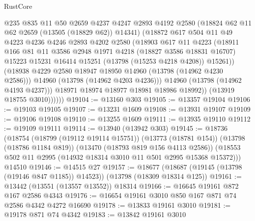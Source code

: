 \begin{lexlean}{RustCore}
\begin{coremodule}
                    @235
                    @835
                    @11
                    @50
                    @2659
                    @4237
                    @4247
                    @2893
                    @4192
                    @2580
                    (@18824 @62 @11 @62 @2659 (@13505 (@18829 @62)) @14341)
                    (@18872
                      @617
                      @504
                      @11
                      @49
                      @4223
                      @4236
                      @4246
                      @2893
                      @4202
                      @2580
                      (@18903
                        @617
                        @11
                        @4223
                        (@18911
                          @166
                          @81
                          @11
                          @3586
                          @2948
                          @1971
                          @4218
                          (@18827 @3586 @18831 @16707)
                          @15223
                          @15231
                          @16414
                          @15251
                          (@13798 (@15253 @4218 @4208))
                          @15261))
                      (@18938 @4229 @2580 @18947 @18950 @14960 (@13798 (@14962 @4230 @2586)))
                      @14960
                      (@13798 (@14962 @4203 @4236)))
                    @14960
                    (@13798 (@14962 @4193 @4237)))
                  @18971
                  @18974
                  @18977
                  @18981
                  @18986
                  @18992))
              (@13919 @18755 @3010))))))
@19104 := @13160 @303
@19105 := @13357 @19104
@19106 := @19103 @19105
@19107 := @13231 @1609
@19108 := @13931 @19107
@19109 := @19106 @19108
@19110 := @13255 @1609
@19111 := @13935 @19110
@19112 := @19109 @19111
@19114 := @13940 (@13942 @303)
@19145 := @18736
    (@18754
      (@18799 (@19112 @19114 @15751))
      (@13773 (@18781 @154))
      (@13798 (@18786 @1184 @819))
      (@13470 (@18793 @819 @156 @4113 @2586))
      (@18553 @502 @11 @2995 (@14932 @18314 @3010 @11 @501 @2995 @15368 @15372)))
    @14510
@19146 := @14515 @27
@19157 := @18677 (@18687 (@19145 (@13798 (@19146 @847 @1185)) @14523)) (@13798 (@18309 @18314 @125))
@19161 := @13442 (@13551 (@13557 @13552)) @18314
@19166 := @16645 @19161 @872 @167 @2586 @4343
@19176 := @16654 @19161 @3010 @850 @167 @871 @74 @2586 @4342 @4272 @16690
@19178 := @13833 @19161 @3010
@19181 := @19178 @871 @74 @4342
@19183 := @13842 @19161 @3010

\end{coremodule}
\end{lexlean}
